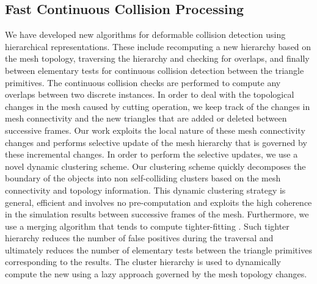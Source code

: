 \subsection{Fast Continuous Collision Processing}\label{ssec:fast_ccd}
We have  developed new algorithms for deformable collision detection using hierarchical representations. These include recomputing a new hierarchy based on the mesh topology, traversing the hierarchy and checking for overlaps, and finally between elementary tests for continuous collision detection between the triangle primitives. The continuous collision checks are performed to compute any overlaps between two discrete instances. In order to deal with the topological changes in the mesh caused by cutting operation, we keep track of the changes in mesh connectivity and the new triangles that are added or deleted between successive frames. Our work exploits the local nature of these mesh connectivity changes and performs selective update of the mesh hierarchy that is governed by these incremental changes. In order to perform the selective updates, we use a novel dynamic clustering scheme. Our clustering scheme quickly decomposes the boundary of the objects into non self-colliding clusters based on the mesh connectivity and topology information. This dynamic clustering strategy is general, efficient and involves no pre-computation and exploits the high coherence in the simulation results between successive frames of the mesh. Furthermore, we use a merging algorithm that tends to compute tighter-fitting . Such tighter hierarchy reduces the number of false positives during the traversal and ultimately reduces the number of elementary tests between the triangle primitives corresponding to the  results. The cluster hierarchy is used to dynamically compute the new  using a lazy approach governed by the mesh topology changes.

